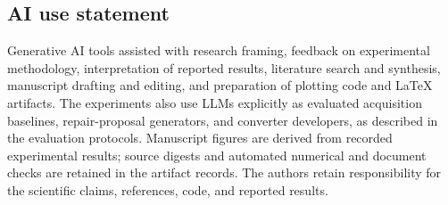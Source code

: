 \subsection*{AI use statement}
Generative AI tools assisted with research framing, feedback on experimental methodology, interpretation of reported results, literature search and synthesis, manuscript drafting and editing, and preparation of plotting code and LaTeX artifacts. The experiments also use LLMs explicitly as evaluated acquisition baselines, repair-proposal generators, and converter developers, as described in the evaluation protocols. Manuscript figures are derived from recorded experimental results; source digests and automated numerical and document checks are retained in the artifact records. The authors retain responsibility for the scientific claims, references, code, and reported results.
